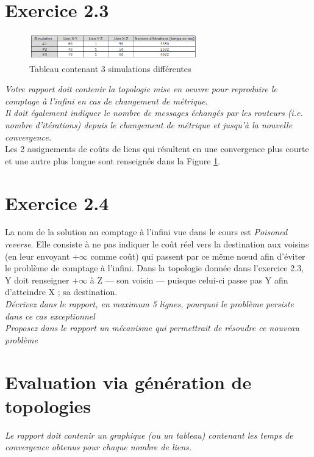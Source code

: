 \documentclass[11pt]{article}
\begin{document}
\section{Exercice 2.3}
\begin{figure} [h!]
\centering
  \includegraphics[width=0.65\textwidth]{../documents/infinity-table.png}
  \caption{Tableau contenant 3 simulations différentes}
   \label{fig:inf-table}
\end{figure}
\textit{Votre rapport doit contenir la topologie mise en oeuvre pour reproduire le comptage à l’infini en cas de changement de métrique}.\\

\textit{Il doit également indiquer le nombre de messages échangés par les routeurs (i.e. nombre d’itérations) depuis le changement de métrique et jusqu’à la nouvelle convergence.}\\

Les 2 assignements de coûts de liens qui résultent en une convergence plus courte et une autre plus longue sont renseignés dans la Figure \ref{fig:inf-table}.

\section{Exercice 2.4}
La nom de la solution au comptage à l'infini vue dans le cours est \textit{Poisoned reverse}. Elle consiste à ne pas indiquer le coût réel vers la destination aux voisins (en leur envoyant $+\infty$ comme coût) qui passent par ce même nœud afin d'éviter le problème de comptage à l'infini. Dans la topologie donnée dans l'exercice 2.3, Y doit renseigner $+\infty$ à Z --- son voisin --- puisque celui-ci passe pas Y afin d'atteindre X ; sa destination.\\

\textit{Décrivez dans le rapport, en maximum 5 lignes, pourquoi le problème persiste dans ce cas
exceptionnel}\\

\textit{Proposez dans le rapport un mécanisme qui permettrait de résoudre ce nouveau
problème}

\section{Evaluation via génération de topologies}
\textit{Le rapport doit contenir un graphique (ou un tableau) contenant les temps de convergence obtenus
pour chaque nombre de liens.}

\vspace{10px}
\begin{center}
\end{center}

\vspace*{\fill}
\end{document}
